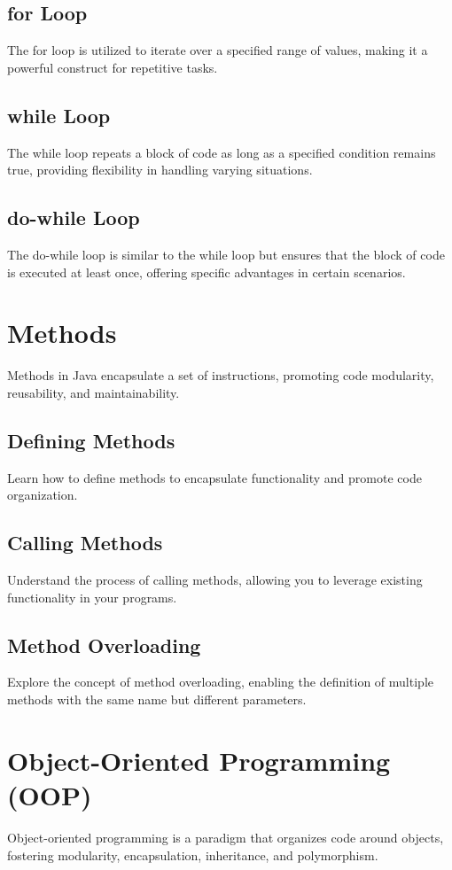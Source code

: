 \documentclass{article}
\begin{document}
\subsection{for Loop}
The for loop is utilized to iterate over a specified range of values, making it a powerful construct for repetitive tasks.

\subsection{while Loop}
The while loop repeats a block of code as long as a specified condition remains true, providing flexibility in handling varying situations.

\subsection{do-while Loop}
The do-while loop is similar to the while loop but ensures that the block of code is executed at least once, offering specific advantages in certain scenarios.

\section{Methods}
Methods in Java encapsulate a set of instructions, promoting code modularity, reusability, and maintainability.

\subsection{Defining Methods}
Learn how to define methods to encapsulate functionality and promote code organization.

\subsection{Calling Methods}
Understand the process of calling methods, allowing you to leverage existing functionality in your programs.

\subsection{Method Overloading}
Explore the concept of method overloading, enabling the definition of multiple methods with the same name but different parameters.

\section{Object-Oriented Programming (OOP)}
Object-oriented programming is a paradigm that organizes code around objects, fostering modularity, encapsulation, inheritance, and polymorphism.
\end{document}
